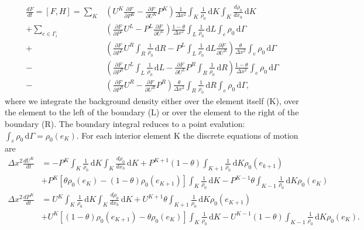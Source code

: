 \documentclass{article}
\begin{document}
\begin{equation}
	\begin{aligned}
		\frac{d F}{d t} = [F, H] = \sum_K & \left(U^K \frac{\partial F}{\partial P^K} - \frac{\partial F}{\partial U^K} P^K\right) \frac{1}{\Delta x^2} \int_K \! \frac{1}{\rho_0} \, \mathrm{d}K   \int_K \! \frac{d \rho_0}{d x_h} \, \mathrm{d}K \\
		+ \sum_{e\in\Gamma_i} & \left( \frac{\partial F}{\partial P^L} U^L - P^L \frac{\partial F}{\partial U^L} \right) \frac{1-\theta}{\Delta x^2} \int_L \! \frac{1}{\rho_0} \, \mathrm{d}L \int_e \! \rho_0 \, \mathrm{d}\Gamma  \\
		+ & \left( \frac{\partial F}{\partial P^L} U^R \int_R \! \frac{1}{\rho_0} \, \mathrm{d}R - P^L \int_L \! \frac{1}{\rho_0} \, \mathrm{d}L \frac{\partial F}{\partial U^R} \right) \frac{\theta}{\Delta x^2} \int_e \! \rho_0 \, \mathrm{d}\Gamma \\
- & \left( \frac{\partial F}{\partial P^R} U^L \int_L \! \frac{1}{\rho_0} \, \mathrm{d}L - \frac{\partial F}{\partial U^L} P^R \int_R \! \frac{1}{\rho_0} \, \mathrm{d}R \right) \frac{1-\theta}{\Delta x^2} \int_e \! \rho_0 \, \mathrm{d}\Gamma\\
	- & \left( \frac{\partial F}{\partial P^R} U^R - \frac{\partial F}{\partial U^R} P^R\right) \frac{\theta}{\Delta x^2} \int_R \! \frac{1}{\rho_0} \, \mathrm{d}R \int_e \! \rho_0 \, \mathrm{d}\Gamma,	
	\end{aligned}
\end{equation}
	where we integrate the background density either over the element itself (K), over the element to the left of the boundary (L) or over the element to the right of the boundary (R). The boundary integral reduces to a point evalution: $\int_e \! \rho_0 \, \mathrm{d}\Gamma = \rho_0(e_K)$. For each interior element K the discrete equations of motion are
\begin{equation}
	\begin{aligned}
		\Delta x^2 \frac{d U^K}{d t} &= -P^K  \int_K \! \frac{1}{\rho_0} \, \mathrm{d}K   \int_K \! \frac{d \rho_0}{d x_h} \, \mathrm{d}K + P^{K+1} (1-\theta) \int_{K+1} \! \frac{1}{\rho_0} \, \mathrm{d}K \rho_0(e_{k+1}) \\
		&+ P^K [\theta \rho_0(e_K) - (1-\theta) \rho_0(e_{K+1})] \int_K \! \frac{1}{\rho_0} \, \mathrm{d}K - P^{K-1} \theta \int_{K-1} \! \frac{1}{\rho_0} \, \mathrm{d}K \rho_0(e_K) \\
		\Delta x^2 \frac{d P^K}{d t} &= U^K \int_K \! \frac{1}{\rho_0} \, \mathrm{d}K   \int_K \! \frac{d \rho_0}{d x_h} \, \mathrm{d}K + U^{K+1} \theta \int_{K+1} \! \frac{1}{\rho_0} \, \mathrm{d}K \rho_0(e_{K+1}) \\
		&+ U^K [(1-\theta) \rho_0(e_{K+1}) - \theta \rho_0(e_K)] \int_K \! \frac{1}{\rho_0} \, \mathrm{d}K - U^{K-1} (1-\theta) \int_{K-1} \! \frac{1}{\rho_0} \, \mathrm{d}K \rho_0(e_K) .
	\end{aligned}
\end{equation}
\end{document}

